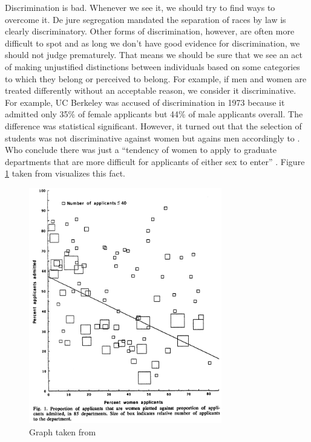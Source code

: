 \documentclass[
  12pt,
  oneside]{book}
\theoremstyle{definition}
\theoremstyle{definition}
\theoremstyle{definition}
\theoremstyle{definition}
\theoremstyle{remark}
\begin{document}
Discrimination is bad. Whenever we see it, we should try to find ways to overcome it. De jure segregation mandated the separation of races by law is clearly discriminatory. Other forms of discrimination, however, are often more difficult to spot and as long we don't have good evidence for discrimination, we should not judge prematurely. That means we should be sure that we see an act of making unjustified distinctions between individuals based on some categories to which they belong or perceived to belong. For example, if men and women are treated differently without an acceptable reason, we consider it discriminative. For example, UC Berkeley was accused of discrimination in 1973 because it admitted only 35\% of female applicants but 44\% of male applicants overall. The difference was statistical significant. However, it turned out that the selection of students was not discriminative against women but agains men accordingly to \citet{Bickel1975Sex}. Who conclude there was just a ``tendency of women to apply to graduate departments that are more difficult for applicants of either sex to enter'' \citep[p.~403]{Bickel1975Sex}. Figure \ref{fig:berkley} taken from \citet[page 403]{Bickel1975Sex} visualizes this fact.

\begin{figure}
\centering
\includegraphics[width=0.75\textwidth,height=\textheight]{fig/berkley.png}
\caption{\label{fig:berkley} Graph taken from \citet[page 403]{Bickel1975Sex}}
\end{figure}
\end{document}
